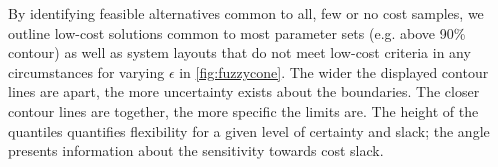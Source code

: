 By identifying feasible alternatives common to all, few or no cost samples, we
outline low-cost solutions common to most parameter sets (e.g. above 90\%
contour) as well as system layouts that do not meet low-cost criteria in any
circumstances for varying $\epsilon$ in \cref{fig:fuzzycone}. The wider the
displayed contour lines are apart, the more uncertainty exists about the
boundaries. The closer contour lines are together, the more specific the limits
are. The height of the quantiles quantifies flexibility for a given level of
certainty and slack; the angle presents information about the sensitivity
towards cost slack.

\begin{figure}
    \vspace{-2cm}
    \noindent{}
    \noindent{}
    \noindent{}
\end{figure}
